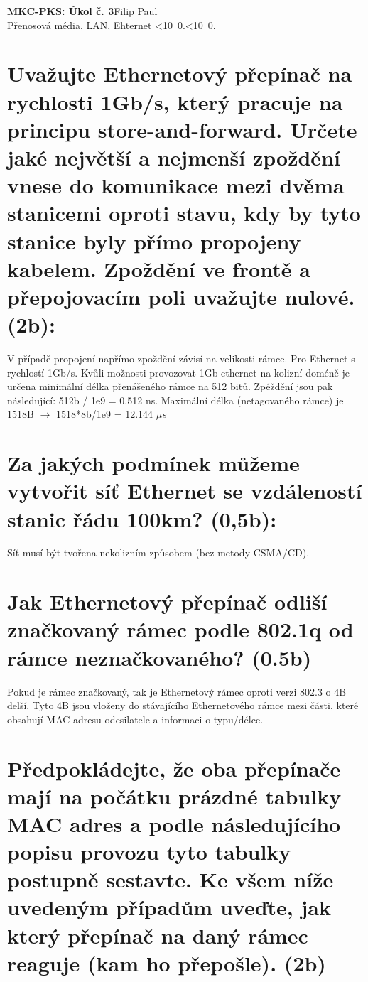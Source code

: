 \documentclass[10pt, a4paper]{article}%
\def\mydate{\leavevmode\hbox{\twodigits\day.\twodigits\month.\the\year}}
\def\twodigits#1{\ifnum#1<10 0\fi\the#1}
\begin{document}
\begin{flushleft}%
	\textbf{\Large{MKC-PKS: Úkol č. 3}}\hfill Filip Paul\\
	\large{Přenosová média, LAN, Ehternet \hfill\mydate}
\end{flushleft}
\section*{\large{\textbf{Uvažujte Ethernetový přepínač na rychlosti 1Gb/s, který pracuje na principu store-and-forward.
Určete jaké největší a nejmenší zpoždění vnese do komunikace mezi dvěma stanicemi 
oproti stavu, kdy by tyto stanice byly přímo propojeny kabelem. Zpoždění ve frontě a 
přepojovacím poli uvažujte nulové. (2b):}}}

V případě propojení napřímo zpoždění závisí na velikosti rámce. Pro Ethernet s rychlostí 1Gb/s. Kvůli možnosti provozovat
1Gb ethernet na kolizní doméně je určena minimální délka přenášeného rámce na 512 bitů. Zpéždění jsou pak následující: 512b / 1e9 =  0.512  ns.
Maximální délka (netagovaného rámce) je 1518B $\rightarrow$ 1518*8b/1e9 = 12.144 $\mu s$

\section*{\large{\textbf{Za jakých podmínek můžeme vytvořit síť Ethernet se vzdáleností stanic řádu 100km? (0,5b):}}}
Síť musí být tvořena nekolizním způsobem (bez metody CSMA/CD).

\section*{\large{\textbf{Jak Ethernetový přepínač odliší značkovaný rámec podle 802.1q od rámce neznačkovaného? (0.5b)}}}
Pokud je rámec značkovaný, tak je Ethernetový rámec oproti verzi 802.3 o 4B delší. Tyto 4B jsou vloženy do stávajícího Ethernetového rámce
mezi části, které obsahují MAC adresu odesilatele a informaci o typu/délce.

\clearpage
\section*{\large{\textbf{Předpokládejte, že oba přepínače mají na počátku prázdné tabulky MAC adres a podle 
následujícího popisu provozu tyto tabulky postupně sestavte. Ke všem níže uvedeným 
případům uveďte, jak který přepínač na daný rámec reaguje (kam ho přepošle). (2b)}}}
\end{document}
